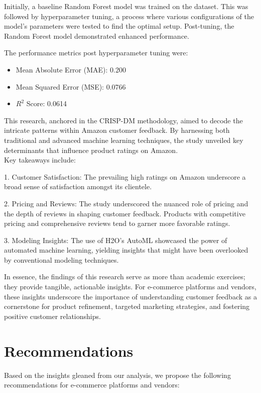 \documentclass[12pt]{article}
\begin{document}
Initially, a baseline Random Forest model was trained on the dataset. This was followed by hyperparameter tuning, a process where various configurations of the model's parameters were tested to find the optimal setup. Post-tuning, the Random Forest model demonstrated enhanced performance.

The performance metrics post hyperparameter tuning were:
\begin{itemize}
    \item Mean Absolute Error (MAE): 0.200
    \item Mean Squared Error (MSE): 0.0766
    \item \( R^2 \) Score: 0.0614
\end{itemize}

This research, anchored in the CRISP-DM methodology, aimed to decode the intricate patterns within Amazon customer feedback. By harnessing both traditional and advanced machine learning techniques, the study unveiled key determinants that influence product ratings on Amazon.\\

Key takeaways include:

1. Customer Satisfaction: The prevailing high ratings on Amazon underscore a broad sense of satisfaction amongst its clientele.
  
2. Pricing and Reviews: The study underscored the nuanced role of pricing and the depth of reviews in shaping customer feedback. Products with competitive pricing and comprehensive reviews tend to garner more favorable ratings.
  
3. Modeling Insights: The use of H2O's AutoML showcased the power of automated machine learning, yielding insights that might have been overlooked by conventional modeling techniques.

In essence, the findings of this research serve as more than academic exercises; they provide tangible, actionable insights. For e-commerce platforms and vendors, these insights underscore the importance of understanding customer feedback as a cornerstone for product refinement, targeted marketing strategies, and fostering positive customer relationships.

\section{Recommendations}

Based on the insights gleaned from our analysis, we propose the following recommendations for e-commerce platforms and vendors:
\end{document}
